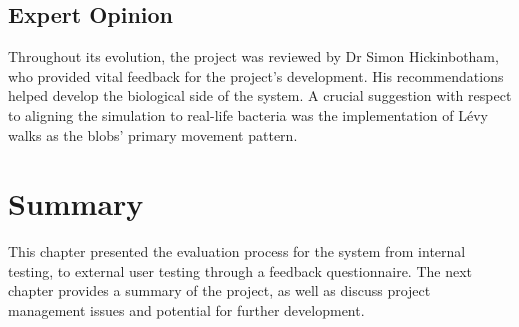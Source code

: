 \subsection{Expert Opinion}

Throughout its evolution, the project was reviewed by Dr Simon Hickinbotham, who provided vital feedback for the project's development. His recommendations helped develop the biological side of the system.  A crucial suggestion with respect to aligning the simulation to real-life bacteria was the implementation of L\'evy walks as the blobs' primary movement pattern.

\section{Summary}
This chapter presented the evaluation process for the system from internal testing, to external user testing through a feedback questionnaire. The next chapter provides a summary of the project, as well as discuss project management issues and potential for further development.